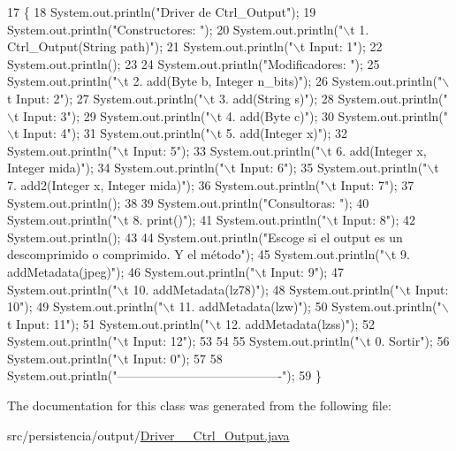 \begin{DoxyCode}
17                                      \{
18         System.out.println(\textcolor{stringliteral}{"Driver de Ctrl\_Output"});
19         System.out.println(\textcolor{stringliteral}{"Constructores: "});
20         System.out.println(\textcolor{stringliteral}{"\(\backslash\)t 1. Ctrl\_Output(String path)"});
21         System.out.println(\textcolor{stringliteral}{"\(\backslash\)t Input: 1"});
22         System.out.println();
23 
24         System.out.println(\textcolor{stringliteral}{"Modificadores: "});
25         System.out.println(\textcolor{stringliteral}{"\(\backslash\)t 2. add(Byte b, Integer n\_bits)"});
26         System.out.println(\textcolor{stringliteral}{"\(\backslash\)t Input: 2"});
27         System.out.println(\textcolor{stringliteral}{"\(\backslash\)t 3. add(String s)"});
28         System.out.println(\textcolor{stringliteral}{"\(\backslash\)t Input: 3"});
29         System.out.println(\textcolor{stringliteral}{"\(\backslash\)t 4. add(Byte c)"});
30         System.out.println(\textcolor{stringliteral}{"\(\backslash\)t Input: 4"});
31         System.out.println(\textcolor{stringliteral}{"\(\backslash\)t 5. add(Integer x)"});
32         System.out.println(\textcolor{stringliteral}{"\(\backslash\)t Input: 5"});
33         System.out.println(\textcolor{stringliteral}{"\(\backslash\)t 6. add(Integer x, Integer mida)"});
34         System.out.println(\textcolor{stringliteral}{"\(\backslash\)t Input: 6"});
35         System.out.println(\textcolor{stringliteral}{"\(\backslash\)t 7. add2(Integer x, Integer mida)"});
36         System.out.println(\textcolor{stringliteral}{"\(\backslash\)t Input: 7"});
37         System.out.println();
38 
39         System.out.println(\textcolor{stringliteral}{"Consultoras: "});
40         System.out.println(\textcolor{stringliteral}{"\(\backslash\)t 8. print()"});
41         System.out.println(\textcolor{stringliteral}{"\(\backslash\)t Input: 8"});
42         System.out.println();
43 
44         System.out.println(\textcolor{stringliteral}{"Escoge si el output es un descomprimido o comprimido. Y el método"});
45         System.out.println(\textcolor{stringliteral}{"\(\backslash\)t 9. addMetadata(jpeg)"});
46         System.out.println(\textcolor{stringliteral}{"\(\backslash\)t Input: 9"});
47         System.out.println(\textcolor{stringliteral}{"\(\backslash\)t 10. addMetadata(lz78)"});
48         System.out.println(\textcolor{stringliteral}{"\(\backslash\)t Input: 10"});
49         System.out.println(\textcolor{stringliteral}{"\(\backslash\)t 11. addMetadata(lzw)"});
50         System.out.println(\textcolor{stringliteral}{"\(\backslash\)t Input: 11"});
51         System.out.println(\textcolor{stringliteral}{"\(\backslash\)t 12. addMetadata(lzss)"});
52         System.out.println(\textcolor{stringliteral}{"\(\backslash\)t Input: 12"});
53 
54 
55         System.out.println(\textcolor{stringliteral}{"\(\backslash\)t 0. Sortir"});
56         System.out.println(\textcolor{stringliteral}{"\(\backslash\)t Input: 0"});
57 
58         System.out.println(\textcolor{stringliteral}{"----------------------------------------"});
59     \}
\end{DoxyCode}


The documentation for this class was generated from the following file\+:\begin{DoxyCompactItemize}
\item 
src/persistencia/output/\hyperlink{Driver____Ctrl__Output_8java}{Driver\+\_\+\+\_\+\+Ctrl\+\_\+\+Output.\+java}\end{DoxyCompactItemize}
